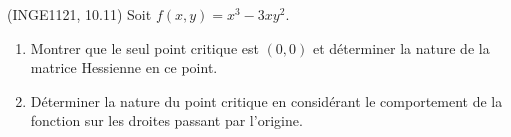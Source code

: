 
\begin{exercice}\label{exoMaximisation-0000}

	(INGE1121, 10.11) Soit $f(x,y)=x^3-3xy^2$.
	\begin{enumerate}

		\item
			Montrer que le seul point critique est $(0,0)$ et déterminer la nature de la matrice Hessienne en ce point.
		\item
			Déterminer la nature du point critique en considérant le comportement de la fonction sur les droites passant par l'origine.

	\end{enumerate}

\end{exercice}
